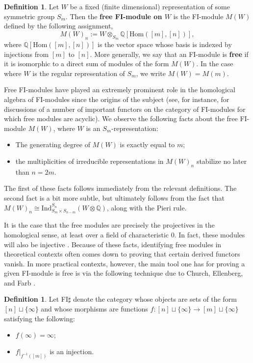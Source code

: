 \documentclass[12pt]{amsart}
\theoremstyle{definition}
\newtheorem{defn}[thm]{Definition}
\newcommand{\Q}{\mathbb{Q}}
\begin{document}
\begin{defn}
    Let $W$ be a fixed (finite dimensional) representation of some symmetric group $S_m$. Then the \textbf{free FI-module on $W$} is the FI-module $M(W)$ defined by the following assignment,
    \[
    M(W)_n := W \otimes_{S_m} \Q[\text{Hom}([m],[n])],
    \]
    where $\Q[\text{Hom}([m],[n])]$ is the vector space whose basis is indexed by injections from $[m]$ to $[n]$. More generally, we say that an FI-module is \textbf{free} if it is isomorphic to a direct sum of modules of the form $M(W)$. In the case where $W$ is the regular representation of $S_m$, we write $M(W) = M(m)$.
\end{defn}

Free FI-modules have played an extremely prominent role in the homological algebra of FI-modules since the origins of the subject (see, for instance, \cite{LR,R,CE,CMNR,N} for discussions of a number of important functors on the category of FI-modules for which free modules are acyclic). We observe the following facts about the free FI-module $M(W)$, where $W$ is an $S_m$-representation:

\begin{itemize}
    \item The generating degree of $M(W)$ is exactly equal to $m$;
    \item the multiplicities of irreducible representations in $M(W)_n$ stabilize no later than $n = 2m$.
\end{itemize}
The first of these facts follows immediately from the relevant definitions. The second fact is a bit more subtle, but ultimately follows from the fact that $M(W)_n \cong \text{Ind}_{S_m \times S_{n-m}}^{S_n} (W \otimes \Q)$, along with the Pieri rule.

It is the case that the free modules are precisely the projectives in the homological sense, at least over a field of characteristic 0. In fact, these modules will also be injective \cite{SS}. Because of these facts, identifying free modules in theoretical contexts often comes down to proving that certain derived functors vanish. In more practical contexts, however, the main tool one has for proving a given FI-module is free is via the following technique due to Church, Ellenberg, and Farb \cite{CEF}.

\begin{defn}
    Let FI$\sharp$ denote the category whose objects are sets of the form $[n] \sqcup \{\infty\}$ and whose morphisms are functions $f:[n] \sqcup \{\infty\} \rightarrow [m] \sqcup \{\infty\}$ satisfying the following:
    \begin{itemize}
        \item $f(\infty) = \infty$;
        \item $f|_{f^{-1}([m])}$ is an injection.
    \end{itemize}
\end{defn}
\end{document}
